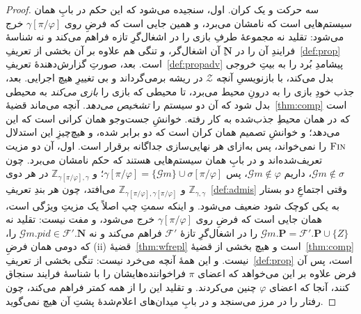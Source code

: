 \documentclass[10pt,oneside,openany]{book}
\newcommand{\Ps}{\mathbf{P}}
\newcommand{\PID}{\mathit{pid}}
\newcommand{\admits}{\mathbf{N}}
\newcommand{\F}{\mathcal{F}}
\newcommand{\Zenv}{\mathcal{Z}}
\newcommand{\ZenvSet}{\mathbb{Z}}
\newcommand{\op}[1]{\textnormal{\textsc{#1}}}
\newcommand{\Gm}{\mathcal{G}m}
\theoremstyle{accentdef}
\theoremstyle{accentplain}
\begin{document}
\begin{proof}
سه حرکت و یک کران. اول، سنجیده می‌شود که این حکم در بابِ همان سیستم‌هایی
است که نامشان می‌برد، و همین جایی است که فرضِ روی $\gamma[\pi/\varphi]$ خرج
می‌شود: تقلید نه مجموعهٔ طرفِ بازی را در اشغال‌گرِ تازه فراهم می‌کند و نه
شناسهٔ فرایندِ آن را در $\admits$ِ آن اشغال‌گر، و تنگی هم علاوه بر آن بخشی
از تعریفِ~\ref{def:prop} است. بعد، صورتِ گزارش‌دهندهٔ
تعریفِ~\ref{def:propadv} پیشامدِ بُرد را به بیتِ خروجی بدل می‌کند، با
بازنویسیِ آنچه $\Zenv$ در ریشه برمی‌گرداند و بی تغییرِ هیچ اجرایی. بعد،
جذب خودِ بازی را به درونِ محیط می‌برد، تا محیطی که بازی را \emph{بازی
می‌کند} به محیطی بدل شود که آن دو سیستم را \emph{تشخیص می‌دهد}. آنچه
می‌ماند قضیهٔ~\ref{thm:comp} است که در همان محیطِ جذب‌شده به کار رفته.
خوانشِ جست‌وجو همان کرانی است که این می‌دهد؛ و خوانشِ تصمیم همان کران است
که دو برابر شده، و هیچ‌چیزِ این استدلال $\op{Fin}$ را نمی‌خواند، پس
به‌ازای هر نهایی‌سازی جداگانه برقرار است.
اول، آن دو مزیت تعریف‌شده‌اند و در بابِ همان سیستم‌هایی هستند که حکم نامشان
می‌برد. چون $\Gm \notin \sigma$، داریم $\Gm \notin \varphi$، پس
$\gamma[\pi/\varphi] = \{\Gm\} \cup \sigma[\pi/\varphi]$؛ و
$\ZenvSet_{\gamma[\pi/\varphi],\gamma}$ در هر دوی
$\ZenvSet_{\gamma,\gamma}$ و
$\ZenvSet_{\gamma[\pi/\varphi],\gamma[\pi/\varphi]}$ می‌افتد، چون هر بندِ
تعریفِ~\ref{def:admis} وقتی اجتماعِ دو بستار به یکی کوچک شود ضعیف می‌شود.
و اینکه سمتِ چپ اصلاً یک مزیتِ ویژگی است، همان جایی است که فرضِ روی
$\gamma[\pi/\varphi]$ خرج می‌شود، و مفت نیست: تقلید نه $\Gm.\Ps = \F'.\Ps
\cup \{Z\}$ را در اشغال‌گرِ تازهٔ $\F'$ فراهم می‌کند و نه $\Gm.\PID \in
\F'.\admits$ را، که دومی همان فرضِ (ii)ِ قضیهٔ~\ref{thm:wfrepl} است و هیچ
بخشی از قضیهٔ~\ref{thm:comp} نیست. و این همهٔ آنچه می‌خرد نیست: تنگی بخشی از
تعریفِ~\ref{def:prop} است، پس آن فرض علاوه بر این می‌خواهد که اعضای $\pi$
فراخواننده‌هایشان را با شناسهٔ فرایند سنجاق کنند، آنجا که اعضای $\varphi$
چنین می‌کردند. و تقلید این را از همه کمتر فراهم می‌کند، چون رفتار را در
مرز می‌سنجد و در بابِ میدان‌های اعلام‌شدهٔ پشتِ آن هیچ نمی‌گوید.


\end{proof}
\end{document}
